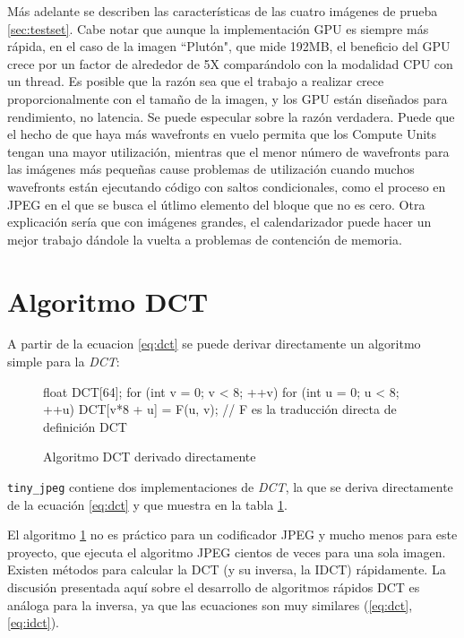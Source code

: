 {Más adelante se describen las características de las cuatro imágenes de prueba
\ref{sec:testset}. Cabe notar que aunque la implementación GPU es siempre más
rápida, en el caso de la imagen ``Plutón", que mide 192MB, el beneficio del GPU
crece por un factor de alrededor de 5X comparándolo con la modalidad CPU con un
thread. Es posible que la razón sea que el trabajo a realizar crece
proporcionalmente con el tamaño de la imagen, y los GPU están diseñados para
rendimiento, no latencia. Se puede especular sobre la razón verdadera. Puede
que el hecho de que haya más wavefronts en vuelo permita que los Compute Units
tengan una mayor utilización, mientras que el menor número de wavefronts para
las imágenes más pequeñas cause problemas de utilización cuando muchos
wavefronts están ejecutando código con saltos condicionales, como el proceso en
JPEG en el que se busca el útlimo elemento del bloque que no es cero. Otra
explicación sería que con imágenes grandes, el calendarizador puede hacer un
mejor trabajo dándole la vuelta a problemas de contención de memoria.


\section{Algoritmo DCT} \label{sec:DCT}

A partir de la ecuacion \ref{eq:dct} se puede derivar directamente un algoritmo
simple para la \emph{DCT}:

\begin{figure}
    \begin{code}[language=C][h]
        float DCT[64];
        for (int v = 0; v < 8; ++v) {
            for (int u = 0; u < 8; ++u) {
                DCT[v*8 + u] = F(u, v);
                // F es la traducción directa de definición DCT
            }
        }
    \end{code}
    \caption{Algoritmo DCT derivado directamente}
    \label{alg:dct}
\end{figure}

\verb+tiny_jpeg+ contiene dos implementaciones de \emph{DCT}, la que se deriva
directamente de la ecuación \ref{eq:dct} y que muestra en la tabla \ref{alg:dct}.

El algoritmo \ref{alg:dct} no es práctico para un codificador JPEG y mucho
menos para este proyecto, que ejecuta el algoritmo JPEG cientos de veces para
una sola imagen. Existen métodos para calcular la DCT (y su inversa, la IDCT)
rápidamente. La discusión presentada aquí sobre el desarrollo de algoritmos
rápidos DCT es análoga para la inversa, ya que las ecuaciones son muy similares
(\ref{eq:dct}, \ref{eq:idct}).

}
